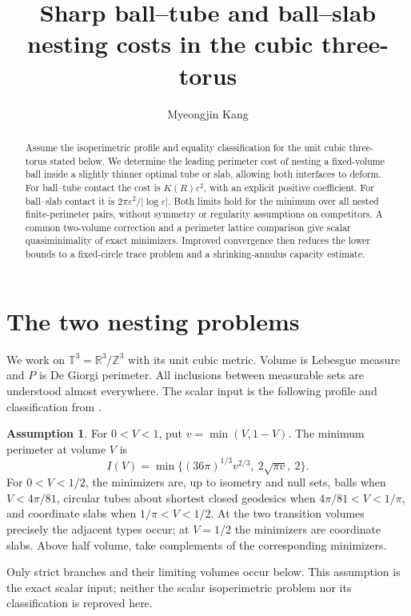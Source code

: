 \documentclass[11pt,reqno]{amsart}
\title[Sharp nesting costs in the cubic torus]{Sharp ball--tube and ball--slab nesting costs in the cubic three-torus}
\author{Myeongjin Kang}
\date{}
\numberwithin{equation}{section}
\theoremstyle{definition}
\newtheorem{assumption}[theorem]{Assumption}
\theoremstyle{remark}
\newcommand{\R}{\mathbb R}
\newcommand{\Z}{\mathbb Z}
\newcommand{\T}{\mathbb T}
\newcommand{\eps}{\varepsilon}
\begin{document}
\begin{abstract}
Assume the isoperimetric profile and equality classification for the unit
cubic three-torus stated below. We determine the leading perimeter cost
of nesting a fixed-volume ball inside a slightly thinner optimal tube
or slab, allowing both interfaces to deform. For ball--tube contact the
cost is $K(R)\eps^2$, with an explicit positive coefficient. For
ball--slab contact it is $2\pi\eps^2/|\log\eps|$. Both limits hold for
the minimum over all nested finite-perimeter pairs, without symmetry or
regularity assumptions on competitors. A common two-volume correction
and a perimeter lattice comparison give scalar quasiminimality of exact
minimizers. Improved convergence then reduces the lower bounds to a
fixed-circle trace problem and a shrinking-annulus capacity estimate.
\end{abstract}
\maketitle

\section{The two nesting problems}
We work on $\T^3=\R^3/\Z^3$ with its unit cubic metric. Volume is
Lebesgue measure and $P$ is De Giorgi perimeter. All inclusions between
measurable sets are understood almost everywhere. The scalar input is
the following profile and classification from \cite{OpenAI}.

\begin{assumption}\label{ass:profile}
For $0<V<1$, put $v=\min(V,1-V)$. The minimum perimeter at volume $V$ is
\[
 I(V)=\min\{(36\pi)^{1/3}v^{2/3},\ 2\sqrt{\pi v},\ 2\}.
\]
For $0<V<1/2$, the minimizers are, up to isometry and null sets,
balls when $V<4\pi/81$, circular tubes about shortest closed geodesics
when $4\pi/81<V<1/\pi$, and coordinate slabs when $1/\pi<V<1/2$.
At the two transition volumes precisely the adjacent types occur;
at $V=1/2$ the minimizers are coordinate slabs. Above half volume,
take complements of the corresponding minimizers.
\end{assumption}
Only strict branches and their limiting volumes occur below.
This assumption is the exact scalar input; neither the scalar
isoperimetric problem nor its classification is reproved here.
\end{document}
